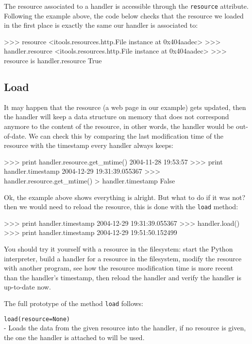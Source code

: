 The resource associated to a handler is accessible through the {\tt resource}
attribute. Following the example above, the code below checks that the
resource we loaded in the first place is exactly the same our handler is
associated to:

\begin{code}
    >>> resource
    <itools.resources.http.File instance at 0x404aadec>
    >>> handler.resource
    <itools.resources.http.File instance at 0x404aadec>
    >>> resource is handler.resource
    True
\end{code}


\subsection{Load}

It may happen that the resource (a web page in our example) gets updated, then
the handler will keep a data structure on memory that does not correspond
anymore to the content of the resource, in other words, the handler would
be out-of-date. We can check this by comparing the last modification time of
the resource with the timestamp every handler always keeps:

\begin{code}
    >>> print handler.resource.get_mtime()
    2004-11-28 19:53:57
    >>> print handler.timestamp
    2004-12-29 19:31:39.055367
    >>> handler.resource.get_mtime() > handler.timestamp
    False
\end{code}

Ok, the example above shows everything is alright. But what to do if it was
not? then we would need to reload the resource, this is done with the
{\tt load} method:

\begin{code}
    >>> print handler.timestamp
    2004-12-29 19:31:39.055367
    >>> handler.load()
    >>> print handler.timestamp
    2004-12-29 19:51:50.152499
\end{code}

You should try it yourself with a resource in the filesystem: start the
Python interpreter, build a handler for a resource in the filesystem,
modify the resource with another program, see how the resource
modification time is more recent than the handler's timestamp, then reload
the handler and verify the handler is up-to-date now.

The full prototype of the method {\tt load} follows:

\begin{api}
  {\tt load(resource=None)}\\
  - Loads the data from the given resource into the handler, if no
    resource is given, the one the handler is attached to will be used.
\end{api}

